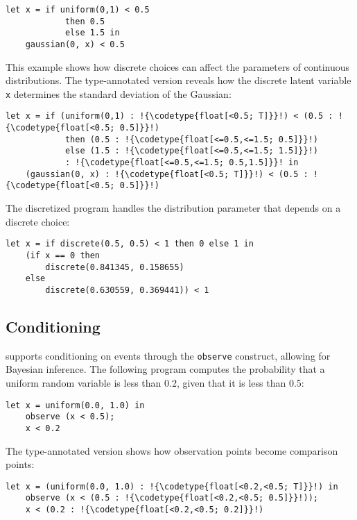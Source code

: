 \documentclass[acmsmall,screen,dvipsnames,x11names,nonacm,anonymous,review]{acmart}
\newcommand{\codetype}[1]{\textcolor{typecolor}{\ttfamily\small#1}}
\newcommand{\Slice}{\text{\scshape Slice}\xspace}
\begin{document}
\begin{lstlisting}[aboveskip=1em,belowskip=1em,escapechar=!]
    let x = if uniform(0,1) < 0.5 
            then 0.5
            else 1.5 in
    gaussian(0, x) < 0.5
\end{lstlisting}

\noindent This example shows how discrete choices can affect the parameters of continuous distributions. The type-annotated version reveals how the discrete latent variable \texttt{x} determines the standard deviation of the Gaussian:

\begin{lstlisting}[aboveskip=1em,belowskip=1em,escapechar=!]
    let x = if (uniform(0,1) : !{\codetype{float[<0.5; T]}}!) < (0.5 : !{\codetype{float[<0.5; 0.5]}}!)
            then (0.5 : !{\codetype{float[<=0.5,<=1.5; 0.5]}}!)
            else (1.5 : !{\codetype{float[<=0.5,<=1.5; 1.5]}}!)
            : !{\codetype{float[<=0.5,<=1.5; 0.5,1.5]}}! in
    (gaussian(0, x) : !{\codetype{float[<0.5; T]}}!) < (0.5 : !{\codetype{float[<0.5; 0.5]}}!)
\end{lstlisting}

\noindent The discretized program handles the distribution parameter that depends on a discrete choice:

\begin{lstlisting}[aboveskip=1em,belowskip=1em]
    let x = if discrete(0.5, 0.5) < 1 then 0 else 1 in
    (if x == 0 then
        discrete(0.841345, 0.158655)
    else
        discrete(0.630559, 0.369441)) < 1
\end{lstlisting}

\subsection{Conditioning}

\Slice supports conditioning on events through the \texttt{observe} construct, allowing for Bayesian inference. The following program computes the probability that a uniform random variable is less than 0.2, given that it is less than 0.5:

\begin{lstlisting}[aboveskip=1em,belowskip=1em,escapechar=!]
    let x = uniform(0.0, 1.0) in
    observe (x < 0.5);
    x < 0.2
\end{lstlisting}

\noindent The type-annotated version shows how observation points become comparison points:

\begin{lstlisting}[aboveskip=1em,belowskip=1em,escapechar=!]
    let x = (uniform(0.0, 1.0) : !{\codetype{float[<0.2,<0.5; T]}}!) in
    observe (x < (0.5 : !{\codetype{float[<0.2,<0.5; 0.5]}}!));
    x < (0.2 : !{\codetype{float[<0.2,<0.5; 0.2]}}!)
\end{lstlisting}
\end{document}
